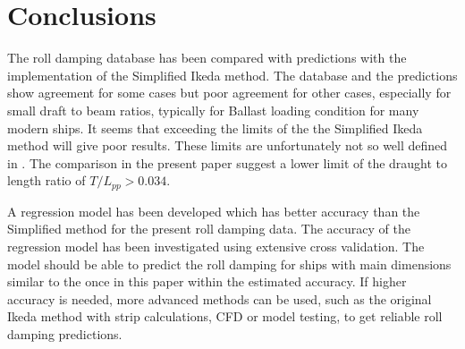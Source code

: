 \section{Conclusions}
\label{se:conclusions}
The roll damping database has been compared with predictions with the implementation of the Simplified Ikeda method. The database and the predictions show agreement for some cases but poor agreement for other cases, especially for small draft to beam ratios, typically for Ballast loading condition for many modern ships. It seems that exceeding the limits of the the Simplified Ikeda method will give poor results. These limits are unfortunately not so well defined in \cite{kawahara_simple_2011}. The comparison in the present paper suggest a lower limit of the draught to length ratio of $T/L_{pp}>0.034$.

A regression model has been developed which has better accuracy than the Simplified method for the present roll damping data. The accuracy of the regression model has been investigated using extensive cross validation. The model should be able to predict the roll damping for ships with main dimensions similar to the once in this paper within the estimated accuracy.
If higher accuracy is needed, more advanced methods can be used, such as the original Ikeda method with strip calculations, CFD or model testing, to get reliable roll damping predictions.

